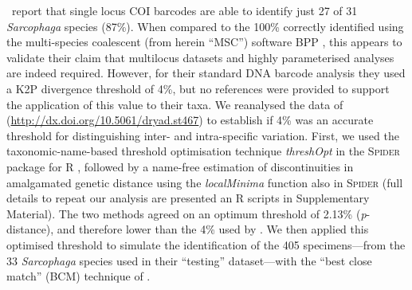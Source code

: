 \documentclass[12pt]{article}
\begin{document}
\citeauthor{Dowton2014}\ report that single locus COI barcodes are able to identify just 27 of 31 \emph{Sarcophaga} species (87\%). When compared to the 100\% correctly identified using the multi-species coalescent (from herein ``MSC'') software BPP \citep{Yang2010}, this appears to validate their claim that multilocus datasets and highly parameterised analyses are indeed required. However, for their standard DNA barcode analysis they used a K2P divergence threshold of 4\%, but no references were provided to support the application of this value to their taxa. We reanalysed the data of \citeauthor{Dowton2014} (\url{http://dx.doi.org/10.5061/dryad.st467}) to establish if 4\% was an accurate threshold for distinguishing inter- and intra-specific variation. First, we used the taxonomic-name-based threshold optimisation technique \textsl{threshOpt} in the \textsc{Spider} package for R \citep{Brown2012}, followed by a name-free estimation of discontinuities in amalgamated genetic distance using the \textsl{localMinima} function also in \textsc{Spider} (full details to repeat our analysis are presented an R scripts in Supplementary Material). The two methods agreed on an optimum threshold of 2.13\% (\emph{p}-distance), and therefore lower than the 4\% used by \citeauthor{Dowton2014}. We then applied this optimised threshold to simulate the identification of the 405 specimens---from the 33 \emph{Sarcophaga} species used in their ``testing'' dataset---with the ``best close match'' (BCM) technique of \citep{Meier2006}.
\end{document}
